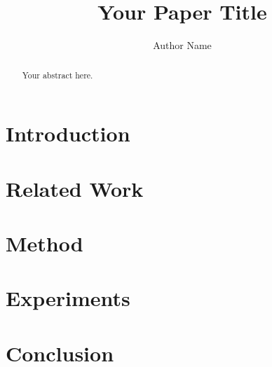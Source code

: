 \documentclass[runningheads]{llncs}
\title{Your Paper Title}
\author{Author Name\inst{1}}
\institute{Institution, City, Country\\
\email{email@example.com}}
\begin{document}
\maketitle

\begin{abstract}
Your abstract here.
\end{abstract}


\section{Introduction}

\section{Related Work}

\section{Method}

\section{Experiments}

\section{Conclusion}



\end{document}
